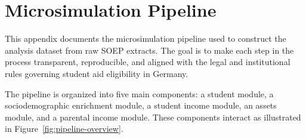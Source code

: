 


\newpage
\section{Microsimulation Pipeline}

This appendix documents the microsimulation pipeline used to construct the analysis dataset from raw SOEP extracts. The goal is to make each step in the process transparent, reproducible, and aligned with the legal and institutional rules governing student aid eligibility in Germany.

The pipeline is organized into five main components: a student module, a sociodemographic enrichment module, a student income module, an assets module, and a parental income module. These components interact as illustrated in Figure~\ref{fig:pipeline-overview}.


